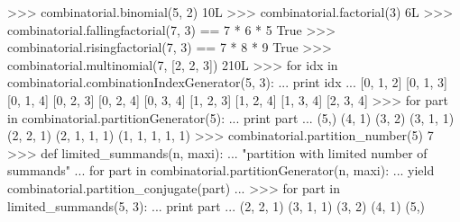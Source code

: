 \begin{ex}
>>> combinatorial.binomial(5, 2)
10L
>>> combinatorial.factorial(3)
6L
>>> combinatorial.fallingfactorial(7, 3) == 7 * 6 * 5
True
>>> combinatorial.risingfactorial(7, 3) == 7 * 8 * 9
True
>>> combinatorial.multinomial(7, [2, 2, 3])
210L
>>> for idx in combinatorial.combinationIndexGenerator(5, 3):
...     print idx
...
[0, 1, 2]
[0, 1, 3]
[0, 1, 4]
[0, 2, 3]
[0, 2, 4]
[0, 3, 4]
[1, 2, 3]
[1, 2, 4]
[1, 3, 4]
[2, 3, 4]
>>> for part in combinatorial.partitionGenerator(5):
...     print part
...
(5,)
(4, 1)
(3, 2)
(3, 1, 1)
(2, 2, 1)
(2, 1, 1, 1)
(1, 1, 1, 1, 1)
>>> combinatorial.partition_number(5)
7
>>> def limited_summands(n, maxi):
...     "partition with limited number of summands"
...     for part in combinatorial.partitionGenerator(n, maxi):
...         yield combinatorial.partition_conjugate(part)
...
>>> for part in limited_summands(5, 3):
...     print part
...
(2, 2, 1)
(3, 1, 1)
(3, 2)
(4, 1)
(5,)
\end{ex}%

\C



